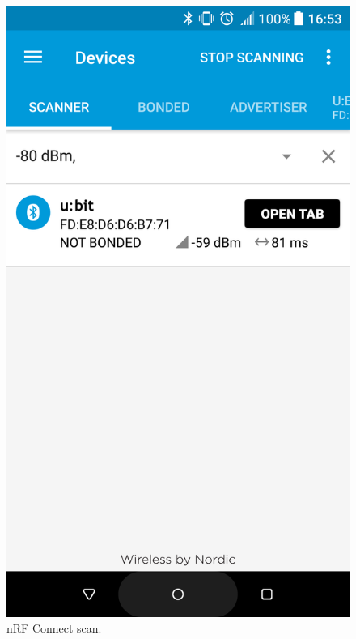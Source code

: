 \documentclass[11pt,a4paper]{article}
\begin{document}
\begin{figure}[ht]
\centering
\begin{minipage}{0.5\linewidth}
\centering
\includegraphics[width=0.9\linewidth]{example_connect_scan.png}
\caption{nRF Connect scan.}
\label{fig::example_scanning}
\end{minipage}%
\begin{minipage}{0.5\linewidth}
\centering

\end{minipage}
\end{figure}
\end{document}
